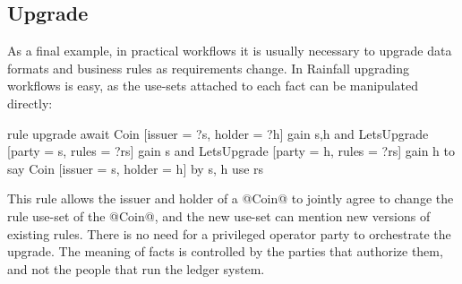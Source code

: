 \subsection{Upgrade}
\label{s:Upgrade}
As a final example, in practical workflows it is usually necessary to upgrade data formats and business rules as requirements change. In Rainfall upgrading workflows is easy, as the use-sets attached to each fact can be manipulated directly:

\begin{small}
\begin{code}
  rule   upgrade
  await  Coin [issuer = ?s, holder = ?h]      gain {s,h}
     and LetsUpgrade [party = s, rules = ?rs] gain {s}
     and LetsUpgrade [party = h, rules = ?rs] gain {h}
  to say Coin [issuer = s, holder = h]
      by {s, h} use rs
\end{code}
\end{small}

This rule allows the issuer and holder of a @Coin@ to jointly agree to change the rule use-set of the @Coin@, and the new use-set can mention new versions of existing rules. There is no need for a privileged operator party to orchestrate the upgrade. The meaning of facts is controlled by the parties that authorize them, and not the people that run the ledger system.






